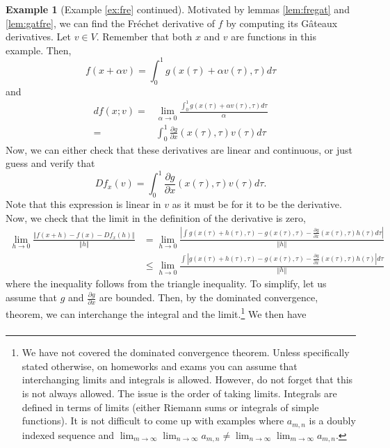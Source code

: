 \documentclass[12pt,reqno]{amsart}
\theoremstyle{definition}
\newtheorem*{example*}{Example}
\newcommand{\norm}[1]{\left\Vert {#1} \right\Vert}
\newcommand{\abs}[1]{\left\vert {#1} \right\vert}
\renewcommand{\to}{{\rightarrow}}
\begin{document}
\begin{example*}[Example \ref{ex:fre} continued]
  Motivated by lemmas \ref{lem:fregat} and \ref{lem:gatfre}, we can
  find the Fr\'{e}chet derivative of $f$ by computing its G\^{a}teaux
  derivatives. Let $v \in V$. Remember that both $x$ and $v$ are
  functions in this example. Then,
  \[ f(x+\alpha v) = \int_{0}^1 g(x(\tau) + \alpha v(\tau), \tau)
  d\tau \]
  and
  \begin{align*}
    df(x;v) = & \lim_{\alpha \to 0} \frac{\int_0^1 g(x(\tau) + \alpha
      v(\tau), \tau) d\tau}{\alpha} \\
    = & \int_0^1 \frac{\partial g}{\partial x}(x(\tau),\tau) v(\tau)
    d\tau
  \end{align*}    
  Now, we can either check that these derivatives are linear and
  continuous, or just guess and verify that
  \[ Df_x(v) = \int_0^1 \frac{\partial g}{\partial x}(x(\tau),\tau)
  v(\tau) d\tau. \]
  Note that this expression is linear in $v$ as it must be for it to
  be the derivative. Now, we check that the limit in the definition of
  the derivative is zero,
  \begin{align*}
    \lim_{h \to 0} \frac{\norm{f(x+h) - f(x) - Df_x(h) }}{\norm{h}} & = 
      \lim_{h \to 0} \frac{ \abs{ \int g(x(\tau) + h(\tau), \tau) -
        g(x(\tau),\tau) - \frac{\partial g}{\partial x}(x(\tau),\tau)
        h(\tau) d\tau} } {\norm{h}} \\ 
    & \leq \lim_{h \to 0} \frac{  \int \abs{ g(x(\tau) + h(\tau), \tau) -
        g(x(\tau),\tau) - \frac{\partial g}{\partial x}(x(\tau),\tau)
        h(\tau)} d\tau } {\norm{h}} 
  \end{align*}
  where the inequality follows from the triangle inequality.  To
  simplify, let us assume that $g$ and $\frac{\partial g}{\partial x}$
  are bounded. Then, by the dominated convergence, theorem, we can
  interchange the integral and the limit.\footnote{We have not covered
    the dominated convergence theorem. Unless specifically stated
    otherwise, on homeworks and exams you can assume that
    interchanging limits and integrals is allowed. However, do not
    forget that this is not always allowed. The issue is the order of
    taking limits. Integrals are defined in terms of limits (either
    Riemann sums or integrals of simple functions). It is not
    difficult to come up with examples where $a_{m,n}$ is a doubly
    indexed sequence and $\lim_{m \to \infty} \lim_{n \to \infty}
    a_{m,n} \neq \lim_{n \to \infty} \lim_{m \to \infty} a_{m,n}$.  
  } 
  We then have
  \begin{align*}

\end{align*}
\end{example*}
\end{document}
